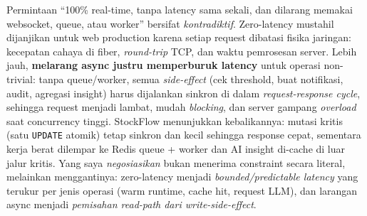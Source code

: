 \documentclass[11pt,a4paper]{article}
\begin{document}
Permintaan ``100\% real-time, tanpa latency sama sekali, dan dilarang memakai websocket,
queue, atau worker'' bersifat \emph{kontradiktif}. Zero-latency mustahil dijanjikan untuk web
production karena setiap request dibatasi fisika jaringan: kecepatan cahaya di fiber,
\emph{round-trip} TCP, dan waktu pemrosesan server. Lebih jauh, \textbf{melarang async justru
memperburuk latency} untuk operasi non-trivial: tanpa queue/worker, semua \emph{side-effect}
(cek threshold, buat notifikasi, audit, agregasi insight) harus dijalankan sinkron di dalam
\emph{request-response cycle}, sehingga request menjadi lambat, mudah \emph{blocking}, dan server
gampang \emph{overload} saat concurrency tinggi. StockFlow menunjukkan kebalikannya: mutasi kritis
(satu \texttt{UPDATE} atomik) tetap sinkron dan kecil sehingga response cepat, sementara kerja berat
dilempar ke Redis queue + worker dan AI insight di-cache di luar jalur kritis. Yang saya
\emph{negosiasikan} bukan menerima constraint secara literal, melainkan menggantinya: zero-latency
menjadi \emph{bounded/predictable latency} yang terukur per jenis operasi (warm runtime, cache hit,
request LLM), dan larangan async menjadi \emph{pemisahan read-path dari write-side-effect}.
\end{document}
